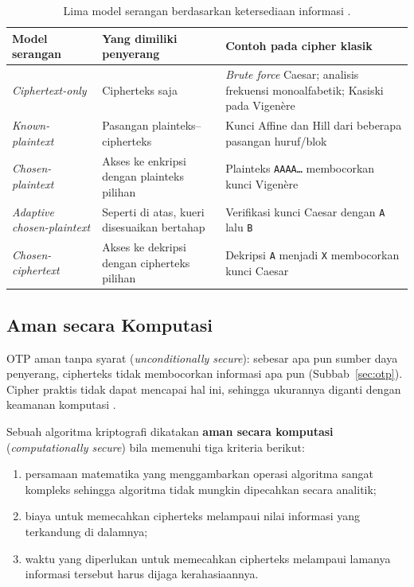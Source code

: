\begin{table}[htbp]
  \centering
  \small
  \begin{tabular}{@{}>{\raggedright\arraybackslash}p{3.4cm}>{\raggedright\arraybackslash}p{4.4cm}>{\raggedright\arraybackslash}p{5cm}@{}}
    \toprule
    Model serangan & Yang dimiliki penyerang & Contoh pada cipher klasik \\
    \midrule
    \textit{Ciphertext-only} & Cipherteks saja & \textit{Brute force} Caesar; analisis frekuensi monoalfabetik; Kasiski pada Vigen\`{e}re \\
    \textit{Known-plaintext} & Pasangan plainteks--cipherteks & Kunci Affine dan Hill dari beberapa pasangan huruf/blok \\
    \textit{Chosen-plaintext} & Akses ke enkripsi dengan plainteks pilihan & Plainteks \texttt{AAAA\ldots} membocorkan kunci Vigen\`{e}re \\
    \textit{Adaptive chosen-plaintext} & Seperti di atas, kueri disesuaikan bertahap & Verifikasi kunci Caesar dengan \texttt{A} lalu \texttt{B} \\
    \textit{Chosen-ciphertext} & Akses ke dekripsi dengan cipherteks pilihan & Dekripsi \texttt{A} menjadi \texttt{X} membocorkan kunci Caesar \\
    \bottomrule
  \end{tabular}
  \caption{Lima model serangan berdasarkan ketersediaan informasi \cite{munir_slides_itb}.}
  \label{tab:model-serangan}
\end{table}

\subsection{Aman secara Komputasi}

OTP aman tanpa syarat (\textit{unconditionally secure}): sebesar apa pun sumber daya penyerang, cipherteks tidak membocorkan informasi apa pun (Subbab~\ref{sec:otp}). Cipher praktis tidak dapat mencapai hal ini, sehingga ukurannya diganti dengan keamanan komputasi \cite{munir_slides_itb,stallings2017}.

\begin{konsep}
Sebuah algoritma kriptografi dikatakan \textbf{aman secara komputasi} (\textit{computationally secure}) bila memenuhi tiga kriteria berikut:
\begin{enumerate}
  \item persamaan matematika yang menggambarkan operasi algoritma sangat kompleks sehingga algoritma tidak mungkin dipecahkan secara analitik;
  \item biaya untuk memecahkan cipherteks melampaui nilai informasi yang terkandung di dalamnya;
  \item waktu yang diperlukan untuk memecahkan cipherteks melampaui lamanya informasi tersebut harus dijaga kerahasiaannya.
\end{enumerate}
\end{konsep}

